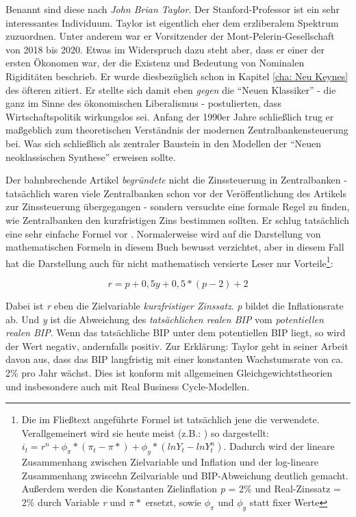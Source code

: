 Benannt sind diese nach \textit{John Brian Taylor}. Der Stanford-Professor ist ein sehr interessantes Individuum. Taylor ist eigentlich eher dem erzliberalem Spektrum zuzuordnen. Unter anderem war er Vorsitzender der Mont-Pelerin-Gesellschaft von 2018 bis 2020. Etwas im Widerspruch dazu steht aber, dass er einer der ersten Ökonomen war, der die Existenz und Bedeutung von Nominalen Rigiditäten beschrieb. Er wurde diesbezüglich schon in Kapitel \ref{cha: Neu Keynes} des öfteren zitiert. Er stellte sich damit eben \textit{gegen} die "`Neuen Klassiker"' - die ganz im Sinne des ökonomischen Liberalismus - postulierten, dass Wirtschaftspolitik wirkungslos sei. Anfang der 1990er Jahre schließlich trug er maßgeblich zum theoretischen Verständnis der modernen Zentralbankensteuerung bei. Was sich schließlich als zentraler Baustein in den Modellen der "`Neuen neoklassischen Synthese"' erweisen sollte.

Der bahnbrechende Artikel \textcite{Taylor1993} \textit{begründete} nicht die Zinssteuerung in Zentralbanken - tatsächlich waren viele Zentralbanken schon vor der Veröffentlichung des Artikels zur Zinssteuerung übergegangen - sondern versuchte eine formale Regel zu finden, wie Zentralbanken den kurzfristigen Zins bestimmen sollten. Er schlug tatsächlich eine sehr einfache Formel vor \parencite[S. 202]{Taylor1993}. Normalerweise wird auf die Darstellung von mathematischen Formeln in diesem Buch bewusst verzichtet, aber in diesem Fall hat die Darstellung auch für nicht mathematisch versierte Leser nur Vorteile\footnote{Die im Fließtext angeführte Formel ist tatsächlich jene die \textcite{Taylor1993} verwendete. Verallgemeinert wird sie heute meist (z.B.: \textcite[S. 609]{Romer2019}) so dargestellt: $i_t = r^n + \phi_{\pi}*(\pi_{t} - \pi*) + \phi_y * (ln Y_t - lnY^{n}_{t})$. Dadurch wird der lineare Zusammenhang zwischen Zielvariable und Inflation und der log-lineare Zusammenhang zwiscehn Zeilvariable und BIP-Abweichung deutlich gemacht. Außerdem werden die Konstanten Zielinflation \textit{p} = 2\% und Real-Zinssatz = 2\% durch Variable \textit{r} und $\pi*$ ersetzt, sowie  $\phi_{\pi}$ und $\phi_y$ statt fixer Werte}:

$$ r = p + 0,5y + 0,5 *(p-2) + 2 $$

Dabei ist \textit{r} eben die Zielvariable \textit{kurzfristiger Zinssatz}. \textit{p} bildet die Inflationsrate ab. Und \textit{y} ist die Abweichung des \textit{tatsächlichen realen BIP} vom \textit{potentiellen realen BIP}. Wenn das tatsächliche BIP unter dem potentiellen BIP liegt, so wird der Wert negativ, andernfalls positiv. Zur Erklärung: Taylor geht in seiner Arbeit davon aus, dass das BIP langfristig mit einer konstanten Wachstumsrate von ca. 2\% pro Jahr wächst. Dies ist konform mit allgemeinen Gleichgewichtstheorien und insbesondere auch mit Real Business Cycle-Modellen.


